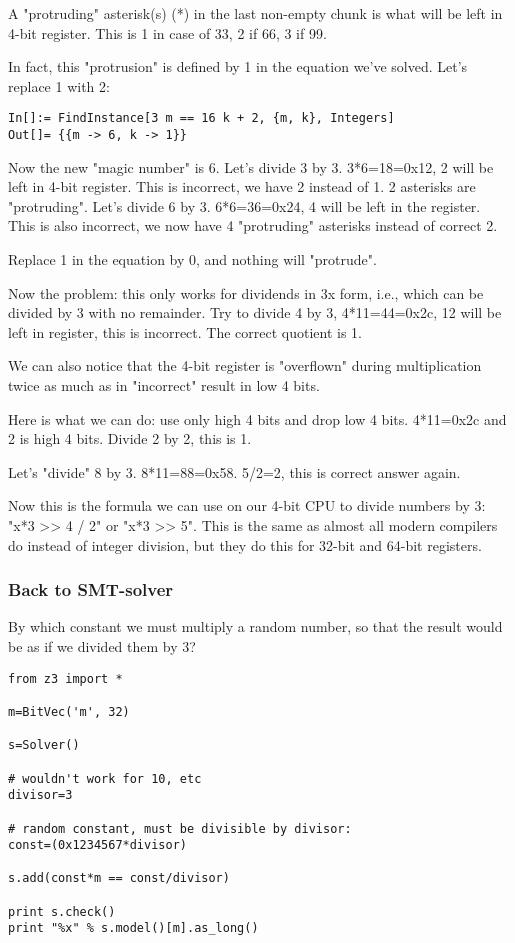 A "protruding" asterisk(s) (*) in the last non-empty chunk is what will be left in 4-bit register.
This is 1 in case of 33, 2 if 66, 3 if 99.

In fact, this "protrusion" is defined by 1 in the equation we've solved.
Let's replace 1 with 2:

\begin{lstlisting}
In[]:= FindInstance[3 m == 16 k + 2, {m, k}, Integers]
Out[]= {{m -> 6, k -> 1}}
\end{lstlisting}

Now the new "magic number" is 6.
Let's divide 3 by 3. 3*6=18=0x12, 2 will be left in 4-bit register. This is incorrect, we have 2 instead of 1. 2 asterisks are "protruding".
Let's divide 6 by 3. 6*6=36=0x24, 4 will be left in the register. This is also incorrect, we now have 4 "protruding" asterisks instead of correct 2.

Replace 1 in the equation by 0, and nothing will "protrude".

Now the problem: this only works for dividends in 3x form, i.e., which can be divided by 3 with no remainder.
Try to divide 4 by 3, 4*11=44=0x2c, 12 will be left in register, this is incorrect.
The correct quotient is 1.

We can also notice that the 4-bit register is "overflown" during multiplication twice as much as in "incorrect" result in low 4 bits.

Here is what we can do: use only high 4 bits and drop low 4 bits.
4*11=0x2c and 2 is high 4 bits.
Divide 2 by 2, this is 1.

Let's "divide" 8 by 3. 8*11=88=0x58. 5/2=2, this is correct answer again.

Now this is the formula we can use on our 4-bit CPU to divide numbers by 3: "x*3 >> 4 / 2" or "x*3 >> 5".
This is the same as almost all modern compilers do instead of integer division, but they do this for 32-bit and 64-bit registers.

\subsubsection{Back to SMT-solver}

By which constant we must multiply a random number, so that the result would be as if we divided them by 3?

\begin{lstlisting}
from z3 import *

m=BitVec('m', 32)

s=Solver()

# wouldn't work for 10, etc
divisor=3

# random constant, must be divisible by divisor:
const=(0x1234567*divisor)

s.add(const*m == const/divisor)

print s.check()
print "%x" % s.model()[m].as_long()
\end{lstlisting}

